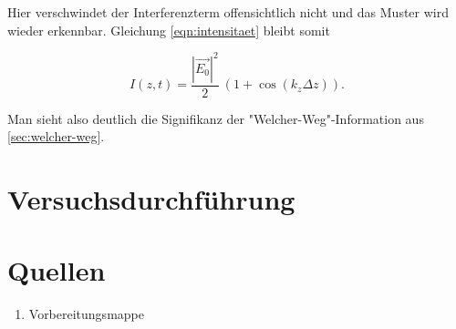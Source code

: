 \documentclass[a4paper,ngerman]{scrartcl}
\begin{document}
Hier verschwindet der Interferenzterm offensichtlich nicht und das Muster wird wieder erkennbar. Gleichung \ref{eqn:intensitaet} bleibt somit

\begin{equation}
I(z,t) = \frac{|\vec{E_0}|^2}{2} \ (1+\cos(k_z\Delta z) ).
\end{equation}

Man sieht also deutlich die Signifikanz der "Welcher-Weg"-Information aus \ref{sec:welcher-weg}.


\section{Versuchsdurchführung}
\label{sec:versuchsdurchfuhrung}








\clearpage
\section{Quellen}
\begin{enumerate}
\item Vorbereitungsmappe \label{ref:mappe}
\end{enumerate}
\end{document}
